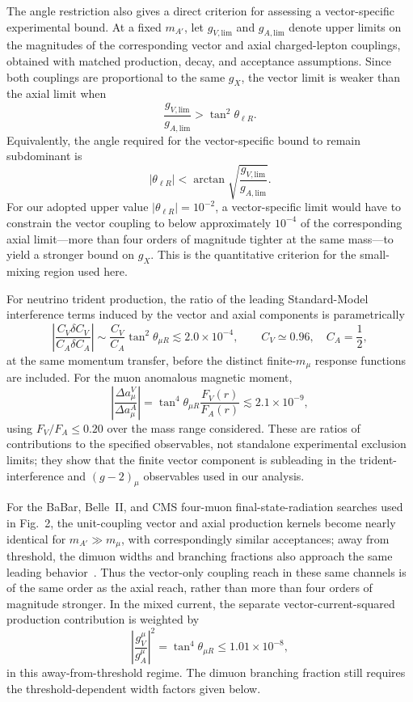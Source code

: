 \documentclass[12pt,a4paper]{article}
\begin{document}
The angle restriction also gives a direct criterion for assessing a vector-specific experimental bound. At a fixed \(m_{A'}\), let \(g_{V,\mathrm{lim}}\) and \(g_{A,\mathrm{lim}}\) denote upper limits on the magnitudes of the corresponding vector and axial charged-lepton couplings, obtained with matched production, decay, and acceptance assumptions. Since both couplings are proportional to the same \(g_X\), the vector limit is weaker than the axial limit when
\[
\frac{g_{V,\mathrm{lim}}}{g_{A,\mathrm{lim}}}>
\tan^2\theta_{\ell R}.
\]
Equivalently, the angle required for the vector-specific bound to remain subdominant is
\[
|\theta_{\ell R}|<
\arctan\sqrt{\frac{g_{V,\mathrm{lim}}}{g_{A,\mathrm{lim}}}}.
\]
For our adopted upper value \(|\theta_{\ell R}|=10^{-2}\), a vector-specific limit would have to constrain the vector coupling to below approximately \(10^{-4}\) of the corresponding axial limit—more than four orders of magnitude tighter at the same mass—to yield a stronger bound on \(g_X\). This is the quantitative criterion for the small-mixing region used here.

For neutrino trident production, the ratio of the leading Standard-Model interference terms induced by the vector and axial components is parametrically
\[
\left|\frac{C_V\delta C_V}{C_A\delta C_A}\right|
\sim\frac{C_V}{C_A}\tan^2\theta_{\mu R}
\lesssim2.0\times10^{-4},
\qquad C_V\simeq0.96,\quad C_A=\frac12,
\]
at the same momentum transfer, before the distinct finite-\(m_\mu\) response functions are included. For the muon anomalous magnetic moment,
\[
\left|\frac{\Delta a_\mu^{V}}{\Delta a_\mu^{A}}\right|
=\tan^4\theta_{\mu R}\frac{F_V(r)}{F_A(r)}
\lesssim2.1\times10^{-9},
\]
using \(F_V/F_A\leq0.20\) over the mass range considered. These are ratios of contributions to the specified observables, not standalone experimental exclusion limits; they show that the finite vector component is subleading in the trident-interference and \((g-2)_\mu\) observables used in our analysis.

\medskip
{}

For the BaBar, Belle~II, and CMS four-muon final-state-radiation searches used in Fig.~2, the unit-coupling vector and axial production kernels become nearly identical for \(m_{A'}\gg m_\mu\), with correspondingly similar acceptances; away from threshold, the dimuon widths and branching fractions also approach the same leading behavior~\cite{BaBar:2016sci,Belle-II:2024wtd,CMS:2018yxg}. Thus the vector-only coupling reach in these same channels is of the same order as the axial reach, rather than more than four orders of magnitude stronger. In the mixed current, the separate vector-current-squared production contribution is weighted by
\[
\left|\frac{g_V^\mu}{g_A^\mu}\right|^2
=\tan^4\theta_{\mu R}\leq1.01\times10^{-8},
\]
in this away-from-threshold regime. The dimuon branching fraction still requires the threshold-dependent width factors given below.
\end{document}
